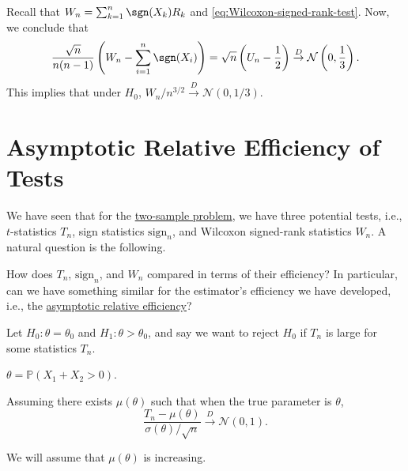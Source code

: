 \begin{remark}
	Recall that \(W_n = \sum_{k=1}^{n} \sgn (X_k) R_k\) and \autoref{eq:Wilcoxon-signed-rank-test}. Now, we conclude that
	\[
		\frac{\sqrt{n}}{n(n-1)} \left( W_n - \sum_{i=1}^{n} \sgn (X_i) \right)
		= \sqrt{n} \left( U_n - \frac{1}{2} \right)
		\overset{D}{\to} \mathcal{N} \left( 0, \frac{1}{3} \right).
	\]
	This implies that under \(H_0\), \(W_n / n^{3 / 2} \overset{D}{\to} \mathcal{N} (0, 1 / 3)\).
\end{remark}

\section{Asymptotic Relative Efficiency of Tests}
We have seen that for the \hyperref[prb:two-sample]{two-sample problem}, we have three potential tests, i.e., \(t\)-statistics \(T_n\), sign statistics \(\mathrm{sign} _n\), and Wilcoxon signed-rank statistics \(W_n\). A natural question is the following.

\begin{problem*}
	How does \(T_n\), \(\mathrm{sign} _n\), and \(W_n\) compared in terms of their efficiency? In particular, can we have something similar for the estimator's efficiency we have developed, i.e., the \hyperref[def:asymptotic-relative-efficiency]{asymptotic relative efficiency}?
\end{problem*}

Let \(H_0 \colon \theta = \theta _0\) and \(H_1 \colon \theta > \theta _0\), and say we want to reject \(H_0\) if \(T_n\) is large for some statistics \(T_n\).

\begin{eg}
	\(\theta = \mathbb{P} (X_1 + X_2 > 0)\).
\end{eg}

Assuming there exists \(\mu (\theta )\) such that when the true parameter is \(\theta \),
\[
	\frac{T_n - \mu (\theta )}{\sigma (\theta ) / \sqrt{n} }
	\overset{D}{\to} \mathcal{N} (0, 1).
\]

\begin{note}
	We will assume that \(\mu (\theta )\) is increasing.
\end{note}

